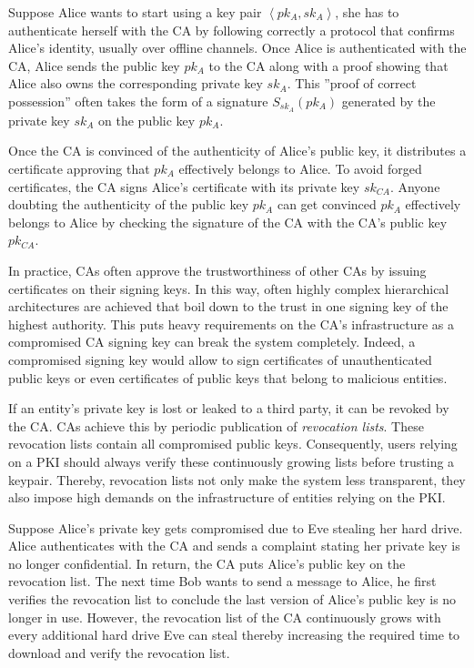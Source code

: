 Suppose Alice wants to start using a key pair $\left< pk_A, sk_A \right>$, she has to authenticate herself with the CA by following correctly a protocol that confirms Alice's identity, usually over offline channels. Once Alice is authenticated with the CA, Alice sends the public key $pk_A$ to the CA along with a proof showing that Alice also owns the corresponding private key $sk_A$. This ''proof of correct possession'' often takes the form of a signature $S_{sk_A} \left( pk_A \right)$ generated by the private key $sk_A$ on the public key $pk_A$.

Once the CA is convinced of the authenticity of Alice's public key, it distributes a certificate approving that $pk_A$ effectively belongs to Alice. To avoid forged certificates, the CA signs Alice's certificate with its private key $sk_{CA}$. Anyone doubting the authenticity of the public key $pk_A$ can get convinced $pk_A$ effectively belongs to Alice by checking the signature of the CA with the CA's public key $pk_{CA}$.

In practice, CAs often approve the trustworthiness of other CAs by issuing certificates on their signing keys. In this way, often highly complex hierarchical architectures are achieved that boil down to the trust in one signing key of the highest authority. This puts heavy requirements on the CA's infrastructure as a compromised CA signing key can break the system completely. Indeed, a compromised signing key would allow to sign certificates of unauthenticated public keys or even certificates of public keys that belong to malicious entities.

If an entity's private key is lost or leaked to a third party, it can be revoked by the CA. CAs achieve this by periodic publication of \textit{revocation lists}. These revocation lists contain all compromised public keys. Consequently, users relying on a PKI should always verify these continuously growing lists before trusting a keypair. Thereby, revocation lists not only make the system less transparent, they also impose high demands on the infrastructure of entities relying on the PKI.

Suppose Alice's private key gets compromised due to Eve stealing her hard drive. Alice authenticates with the CA and sends a complaint stating her private key is no longer confidential. In return, the CA puts Alice's public key on the revocation list. The next time Bob wants to send a message to Alice, he first verifies the revocation list to conclude the last version of Alice's public key is no longer in use. However, the revocation list of the CA continuously grows with every additional hard drive Eve can steal thereby increasing the required time to download and verify the revocation list.


